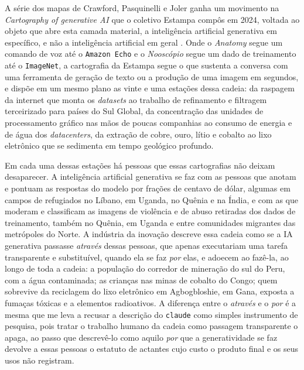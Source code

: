 A série dos mapas de Crawford, Pasquinelli e Joler ganha um movimento na \textit{Cartography of generative AI} que o coletivo Estampa compôs em 2024, voltada ao objeto que abre esta camada material, a inteligência artificial generativa em específico, e não a inteligência artificial em geral \parencite{Estampa_Cartografia_IA}. Onde o \textit{Anatomy} segue um comando de voz até o \texttt{Amazon Echo} e o \emph{Nooscópio} segue um dado de treinamento até o \texttt{ImageNet}, a cartografia da Estampa segue o que sustenta a conversa com uma ferramenta de geração de texto ou a produção de uma imagem em segundos, e dispõe em um mesmo plano as vinte e uma estações dessa cadeia: da raspagem da internet que monta os \emph{datasets} ao trabalho de refinamento e filtragem terceirizado para países do Sul Global, da concentração das unidades de processamento gráfico nas mãos de poucas companhias ao consumo de energia e de água dos \emph{datacenters}, da extração de cobre, ouro, lítio e cobalto ao lixo eletrônico que se sedimenta em tempo geológico profundo.

Em cada uma dessas estações há pessoas que essas cartografias não deixam desaparecer. A inteligência artificial generativa se faz com as pessoas que anotam e pontuam as respostas do modelo por frações de centavo de dólar, algumas em campos de refugiados no Líbano, em Uganda, no Quênia e na Índia, e com as que moderam e classificam as imagens de violência e de abuso retiradas dos dados de treinamento, também no Quênia, em Uganda e entre comunidades migrantes das metrópoles do Norte. A indústria da inovação descreve essa cadeia como se a IA generativa passasse \emph{através} dessas pessoas, que apenas executariam uma tarefa transparente e substituível, quando ela se faz \emph{por} elas, e adoecem ao fazê-la, ao longo de toda a cadeia: a população do corredor de mineração do sul do Peru, com a água contaminada; as crianças nas minas de cobalto do Congo; quem sobrevive da reciclagem do lixo eletrônico em Agbogbloshie, em Gana, exposta a fumaças tóxicas e a elementos radioativos. A diferença entre o \emph{através} e o \emph{por} é a mesma que me leva a recusar a descrição do \texttt{claude} como simples instrumento de pesquisa, pois tratar o trabalho humano da cadeia como passagem transparente o apaga, ao passo que descrevê-lo como aquilo \emph{por} que a generatividade se faz devolve a essas pessoas o estatuto de actantes cujo custo o produto final e os seus usos não registram.

